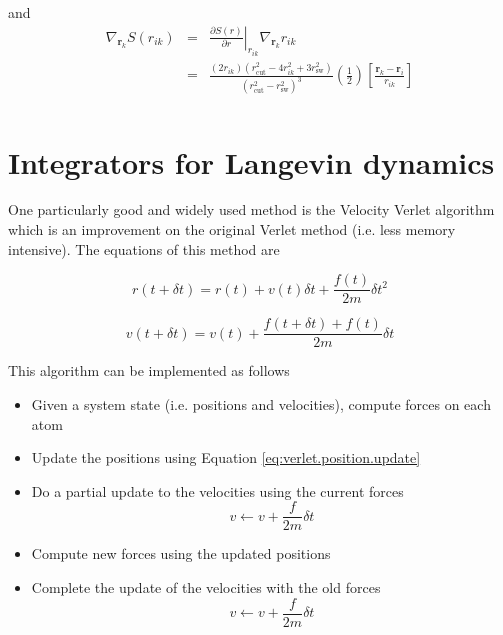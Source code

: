 \documentclass[aip,jcp,preprint,superscriptaddress,floatfix]{revtex4-1}
\begin{document}
and
\begin{eqnarray}
\nabla_{\mathbf{r}_k} S(r_{ik}) &=& \left. \frac{\partial S(r)}{\partial r} \right|_{r_{ik}} \nabla_{\mathbf{r}_k} r_{ik}  \\
&=&\frac{(2 r_{ik}) (r_\mathrm{cut}^2 -4 r_{ik}^2 + 3 r_\mathrm{sw}^2)}{(r_\mathrm{cut}^2 - r_\mathrm{sw}^2)^3} \left( \frac{1}{2}\right) \left[ \frac{\mathbf{r}_k - \mathbf{r}_i}{r_{ik}} \right] \\
\end{eqnarray}

\section{Integrators for Langevin dynamics}

One particularly good and widely used method is the Velocity Verlet algorithm
which is an improvement on the original Verlet method (i.e. less memory
intensive). The equations of this method are

\begin{equation}
	r \left( t + \delta t \right) = r \left( t \right) + v \left( t \right) \delta t + \frac{f \left(t \right) }{2 m} \delta t ^2
\label{eq:verlet.position.update}
\end{equation}

\begin{equation}
	v \left( t + \delta t \right) = v \left( t \right) + \frac{f \left( t + \delta t \right) + f \left(t \right) }{2m} \delta t
\end{equation}

This algorithm can be implemented as follows

\begin{itemize}
	\item Given a system state (i.e. positions and velocities), 
		compute forces on each atom
	\item Update the positions using Equation \ref{eq:verlet.position.update}
	\item Do a partial update to the velocities using the current forces
		\begin{equation}
			v \leftarrow v + \frac{f}{2m} \delta t
		\end{equation}
	\item Compute new forces using the updated positions
	\item Complete the update of the velocities with the old forces
		\begin{equation}
			v \leftarrow v + \frac{f}{2m} \delta t
		\end{equation}

\end{itemize}
\end{document}
